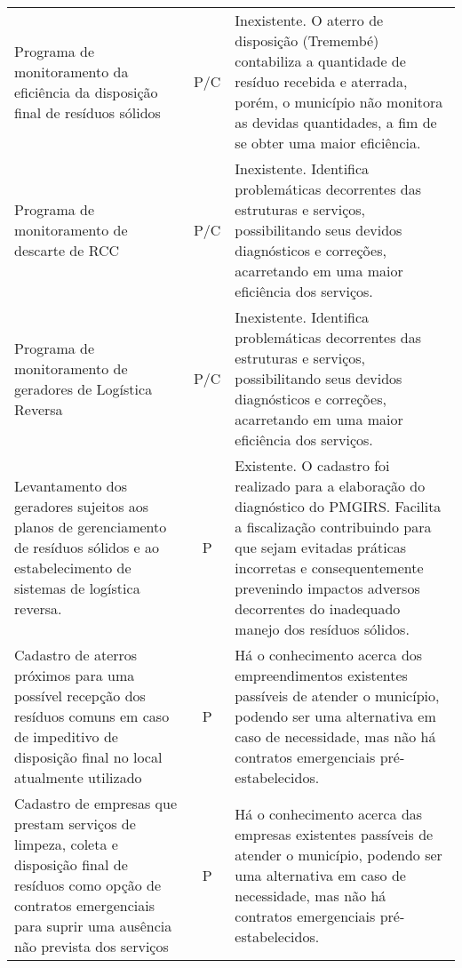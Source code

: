 \begin{table}[htbp]
\begin{tabular}{p{23.455em}cp{27.725em}}
		\rowcolor[rgb]{ .984,  .831,  .706} Programa de monitoramento da eficiência da disposição final de resíduos sólidos & P/C   & Inexistente. O aterro de disposição (Tremembé) contabiliza a quantidade de resíduo recebida e aterrada, porém, o município não monitora as devidas quantidades, a fim de se obter uma maior eficiência. \\
		\rowcolor[rgb]{ .992,  .914,  .851} Programa de monitoramento de descarte de RCC & P/C   & Inexistente. Identifica problemáticas decorrentes das estruturas e serviços, possibilitando seus devidos diagnósticos e correções, acarretando em uma maior eficiência dos serviços. \\
		\rowcolor[rgb]{ .984,  .831,  .706} Programa de monitoramento de geradores de Logística Reversa & P/C   & Inexistente. Identifica problemáticas decorrentes das estruturas e serviços, possibilitando seus devidos diagnósticos e correções, acarretando em uma maior eficiência dos serviços. \\
		\rowcolor[rgb]{ .992,  .914,  .851} Levantamento dos geradores sujeitos aos planos de gerenciamento de resíduos sólidos e ao estabelecimento de sistemas de logística reversa. & P     & Existente. O cadastro foi realizado para a elaboração do diagnóstico do PMGIRS. Facilita a fiscalização contribuindo para que sejam evitadas práticas incorretas e consequentemente prevenindo impactos adversos decorrentes do inadequado manejo dos resíduos sólidos. \\
		\rowcolor[rgb]{ .984,  .831,  .706} Cadastro de aterros próximos para uma possível recepção dos resíduos comuns em caso de impeditivo de disposição final no local atualmente utilizado & P     & Há o conhecimento acerca dos empreendimentos existentes passíveis de atender o município, podendo ser uma alternativa em caso de necessidade, mas não há contratos emergenciais pré-estabelecidos. \\
		\rowcolor[rgb]{ .992,  .914,  .851} Cadastro de empresas que prestam serviços de limpeza, coleta e disposição final de resíduos como opção de contratos emergenciais para suprir uma ausência não prevista dos serviços & P     & Há o conhecimento acerca das empresas existentes passíveis de atender o município, podendo ser uma alternativa em caso de necessidade, mas não há contratos emergenciais pré-estabelecidos. \\
	\end{tabular}%
	\label{tab:acoes_prevent}%
\end{table}%
